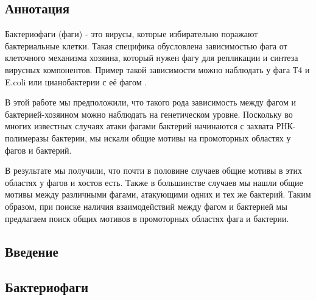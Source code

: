 \documentclass[14pt]{extarticle}
\begin{document}
%


\begin{center}
\item \section{Аннотация}
\end{center}

\par{Бактериофаги (фаги) - это вирусы, которые избирательно поражают бактериальные клетки. Такая специфика обусловлена
зависимостью фага от клеточного механизма хозяина, который нужен фагу для репликации и синтеза вирусных компонентов.
Пример такой зависимости можно наблюдать у фага Т4 и E.coli \cite{hinton} или цианобактерии с её фагом 
\cite{puxty-evanx}.}

\par{В этой работе мы предположили, что такого рода зависимость между фагом и бактерией-хозяином можно 
наблюдать на генетическом уровне. Поскольку во многих известных случаях атаки фагами бактерий начинаются с захвата 
РНК-полимеразы бактерии, мы искали общие мотивы на промоторных областях у фагов и бактерий.}

\par{ В результате мы получили, что почти в половине случаев общие мотивы в этих областях у фагов и хостов есть. Также
в большинстве случаев мы нашли общие мотивы между различными фагами, атакующими одних и тех же бактерий. Таким образом, 
при поиске наличия взаимодействий между фагом и бактерией мы предлагаем поиск общих мотивов в промоторных областях фага 
и бактерии.}


\newpage
\begin{spacing}{1.2}
  \tableofcontents
\end{spacing}

\newpage
\begin{center}
\item \section{Введение}
\end{center}

    \begin{center}
    \item \subsection{Бактериофаги}
    \end{center}
    
\end{document}
